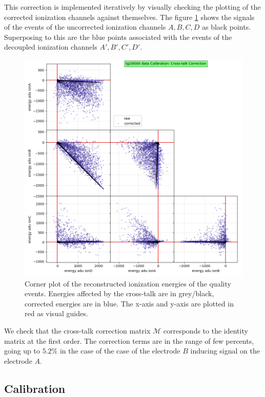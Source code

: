 This correction is implemented iteratively by visually checking the plotting of the corrected ionization channels against themselves. The figure \ref{fig:crosstalk-correction} shows the signals of the events of the uncorrected ionization channels $A, B, C, D$ as black points. Superposing to this are the blue points associated with the events of the decoupled ionization channels $A', B', C', D'$.

\begin{figure}
\centering
\includegraphics[width=\linewidth,]{Figures/Neutron/crosstalk_correction.png}
\caption{Corner plot of the reconstructed ionization energies of the quality events. Energies affected by the cross-talk are in grey/black, corrected energies are in blue. The x-axis and y-axis are plotted in red as visual guides.}
\label{fig:crosstalk-correction}
\end{figure}

We check that the cross-talk correction matrix $\mathcal{M}$ corresponds to the identity matrix at the first order. The correction terms are in the range of few percents, going up to $5.2\%$ in the case of the case of the electrode $B$ inducing signal on the electrode $A$.


\subsection{Calibration}

